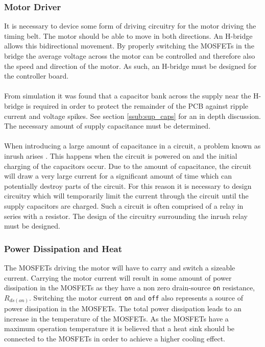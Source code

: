 \subsubsection{Motor Driver}
It is necessary to device some form of driving circuitry for the motor driving the timing belt.
The motor should be able to move in both directions. 
An H-bridge allows this bidirectional movement.
By properly switching the MOSFETs in the bridge the average voltage across the motor can be controlled and therefore also the speed and direction of the motor.
As such, an H-bridge must be designed for the controller board.
\\~\\
From simulation it was found that a capacitor bank across the supply near the H-bridge is required in order to protect the remainder of the PCB against ripple current and voltage spikes.
See section \ref{ssub:sup_caps} for an in depth discussion.
The necessary amount of supply capacitance must be determined.
\\~\\
When introducing a large amount of capacitance in a circuit, a problem known as inrush arises \cite{inrush}.
This happens when the circuit is powered on and the initial charging of the capacitors occur.
Due to the amount of capacitance, the circuit will draw a very large current for a significant amount of time which can potentially destroy parts of the circuit.
For this reason it is necessary to design circuitry which will temporarily limit the current through the circuit until the supply capacitors are charged.
Such a circuit is often comprised of a relay in series with a resistor.
The design of the circuitry surrounding the inrush relay must be designed.

\subsubsection{Power Dissipation and Heat}
The MOSFETs driving the motor will have to carry and switch a sizeable current.
Carrying the motor current will result in some amount of power dissipation in the MOSFETs as they have a non zero drain-source \texttt{on} resistance, $R_{ds(on)}$.
Switching the motor current \texttt{on} and \texttt{off} also represents a source of power dissipation in the MOSFETs.
The total power dissipation leads to an increase in the temperature of the MOSFETs.
As the MOSFETs have a maximum operation temperature it is believed that a heat sink should be connected to the MOSFETs in order to achieve a higher cooling effect.



